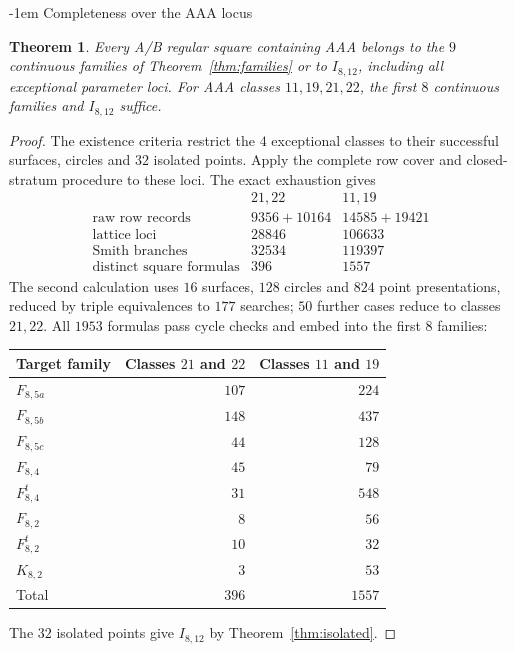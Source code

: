 \documentclass[11pt,a4paper]{article}
\makeatletter
\newtheorem{theorem}{Theorem}[section]
\theoremstyle{plain}
\theoremstyle{definition}
\numberwithin{equation}{section}
\renewcommand\subsection{\@startsection{subsection}{2}{\z@}  {\medskipamount}  {-1em}  {\normalfont\normalsize\bfseries}}
\makeatother
\begin{document}
\subsection{Completeness over the AAA locus}\label{sec:AAAexceptionalcomplete}\label{sec:AAAuniformcomplete}
\begin{theorem}\label{thm:AAAexceptionalcomplete}\label{thm:AAAuniformcomplete}\label{cor:AAAABcomplete}
Every A/B regular square containing AAA belongs to the $9$ continuous families of Theorem~\ref{thm:families} or to $I_{8,12}$, including all exceptional parameter loci. For AAA classes $11,19,21,22$, the first $8$ continuous families and $I_{8,12}$ suffice.
\end{theorem}
\begin{proof}
The existence criteria restrict the $4$ exceptional classes to their successful surfaces, circles and $32$ isolated points. Apply the complete row cover and closed-stratum procedure to these loci. The exact exhaustion gives
$$\begin{array}{l|rr}
&21,22&11,19\\\hline
\text{raw row records}&9356+10164&14585+19421\\
\text{lattice loci}&28846&106633\\
\text{Smith branches}&32534&119397\\
\text{distinct square formulas}&396&1557
\end{array}$$
The second calculation uses $16$ surfaces, $128$ circles and $824$ point presentations, reduced by triple equivalences to $177$ searches; $50$ further cases reduce to classes $21,22$. All $1953$ formulas pass cycle checks and embed into the first $8$ families:
\begin{center}\begin{tabular}{lrr}
\toprule
Target family & Classes $21$ and $22$ & Classes $11$ and $19$\\
\midrule
$F_{8,5a}$&$107$&$224$\\
$F_{8,5b}$&$148$&$437$\\
$F_{8,5c}$&$44$&$128$\\
$F_{8,4}$&$45$&$79$\\
$F_{8,4}^{t}$&$31$&$548$\\
$F_{8,2}$&$8$&$56$\\
$F_{8,2}^{t}$&$10$&$32$\\
$K_{8,2}$&$3$&$53$\\
\midrule
Total&$396$&$1557$\\
\bottomrule
\end{tabular}\end{center}
The $32$ isolated points give $I_{8,12}$ by Theorem~\ref{thm:isolated}.


\end{proof}
\end{document}
